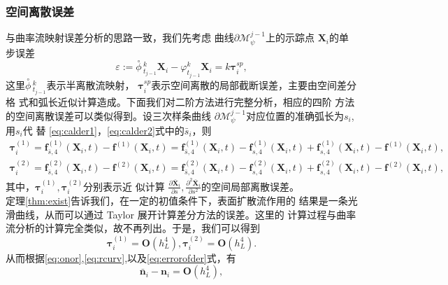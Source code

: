\documentclass[a4paper,twoside]{ctexart}
\newcommand{\pdfrac}[2]{\frac{\partial #1}{\partial #2}}
\begin{document}
  \subsubsection{空间离散误差}
与曲率流映射误差分析的思路一致，我们先考虑
曲线$\partial\mathcal{M}_{\psi}^{j-1}$上的示踪点
$\boldsymbol X_i$的单步误差
\begin{equation}
  \label{eq:maponesteperr}
  \varepsilon := {{\overset{\circ}{\phi}}\, \! _{t_{j-1}}^k} \boldsymbol X_i -
  \varphi  _{t_{j-1}}^k\boldsymbol X_i = k \boldsymbol{\tau}_i^{sp},
\end{equation}
这里${{\overset{\circ}{\phi}}\, \! _{t_{j-1}}^k}$表示半离散流映射，
$\boldsymbol{\tau}_i^{sp}$表示空间离散的局部截断误差，主要由空间差分格
式和弧长近似计算造成。下面我们对二阶方法进行完整分析，相应的四阶
方法的空间离散误差可以类似得到。设三次样条曲线
$\partial\mathcal{M}_{\psi}^{j-1}$对应位置的准确弧长为$s_i$,用$s_i$代
替
\eqref{eq:calder1}，\eqref{eq:calder2}式中的$\bar{s}_i$，则
\begin{eqnarray}
  \label{eq:errorofder1}
  \boldsymbol{\tau}_i^{(1)} =
  \boldsymbol f_{\bar{s},4}^{(1)}(\boldsymbol X_i,t) -
  \boldsymbol f^{(1)}(\boldsymbol X_i,t) =
  \boldsymbol f_{\bar{s},4}^{(1)}(\boldsymbol X_i,t) -
  \boldsymbol f_{s,4}^{(1)}(\boldsymbol X_i,t) +
  \boldsymbol f_{s,4}^{(1)}(\boldsymbol X_i,t) -
  \boldsymbol f^{(1)}(\boldsymbol X_i,t),\\
  \label{eq:errorofder2}
  \boldsymbol{\tau}_i^{(2)} =
  \boldsymbol f_{\bar{s},4}^{(2)}(\boldsymbol X_i,t) -
  \boldsymbol f^{(2)}(\boldsymbol X_i,t) =
  \boldsymbol f_{\bar{s},4}^{(2)}(\boldsymbol X_i,t) -
  \boldsymbol f_{s,4}^{(2)}(\boldsymbol X_i,t) +
  \boldsymbol f_{s,4}^{(2)}(\boldsymbol X_i,t) -
  \boldsymbol f^{(2)}(\boldsymbol X_i,t),
\end{eqnarray}
其中，$\boldsymbol{\tau}_i^{(1)},\boldsymbol{\tau}_i^{(2)}$分别表示近
似计算
$\pdfrac{\bar{\boldsymbol X}_i}{s},\frac{\partial^2\bar{\boldsymbol X}_i}{\partial
  s^2}$的空间局部离散误差。\\
\indent 定理\ref{thm:exist}告诉我们，在一定的初值条件下，表面扩散流作用的
结果是一条光滑曲线，从而可以通过 Taylor 展开计算差分方法的误差。这里的
计算过程与曲率流分析的计算完全类似，故不再列出。于是，我们可以得到
\begin{equation}
  \label{eq:errorofder}
  \boldsymbol{\tau}_i^{(1)} = \mathbf{O}(h_L^4), \boldsymbol{\tau}_i^{(2)} = \mathbf{O}(h_L^4).
\end{equation}
从而根据\eqref{eq:onor},\eqref{eq:rcurv},以及\eqref{eq:errorofder}式，有
\begin{equation}
\label{eq:errorofnorm}
\bar{\boldsymbol n}_i - \boldsymbol n_i = \mathbf{O}(h_L^4),
\end{equation}
\end{document}
